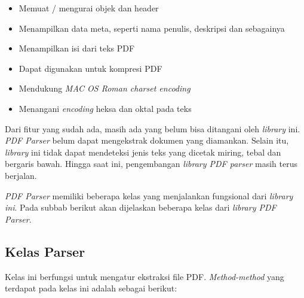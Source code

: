 \begin{itemize}
	\item Memuat / mengurai objek dan header
	\item Menampilkan data meta, seperti nama penulis, deskripsi dan sebagainya
	\item Menampilkan isi dari teks PDF
	\item Dapat digunakan untuk kompresi PDF
	\item Mendukung \textit{MAC OS Roman charset encoding}
	\item Menangani \textit{encoding} heksa dan oktal pada teks
\end{itemize}

Dari fitur yang sudah ada, masih ada yang belum bisa ditangani oleh \textit{library} ini. \textit{PDF Parser} belum dapat mengekstrak dokumen yang diamankan. Selain itu, \textit{library} ini tidak dapat mendeteksi jenis teks yang dicetak miring, tebal dan bergaris bawah. Hingga saat ini, pengembangan \textit{library PDF parser} masih terus berjalan. 

\textit{PDF Parser} memiliki beberapa kelas yang menjalankan fungsional dari \textit{library ini}. Pada subbab berikut akan dijelaskan beberapa kelas dari \textit{library PDF Parser}.

\subsection{Kelas Parser}
Kelas ini berfungsi untuk mengatur ekstraksi file PDF. \textit{Method-method} yang terdapat pada kelas ini adalah sebagai berikut:

